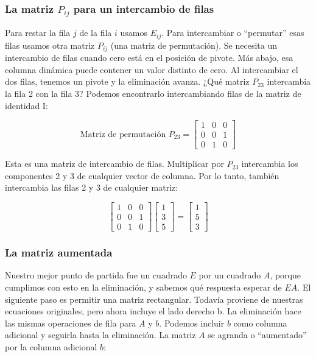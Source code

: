 \subsubsection{La matriz $P_{ij}$ para un intercambio de filas}

Para restar la fila $j$ de la fila $i$ usamos $E_{ij}$. Para intercambiar o ``permutar'' esas filas usamos
otra matriz $P_{ij}$ (una matriz de permutación). Se necesita un intercambio de filas cuando cero está en el
posición de pivote. Más abajo, esa columna dinámica puede contener un valor distinto de cero. Al intercambiar el
dos filas, tenemos un pivote y la eliminación avanza.
¿Qué matriz $P_{23}$ intercambia la fila 2 con la fila 3? Podemos encontrarlo intercambiando filas de
la matriz de identidad I:

\begin{equation}
	\text{Matriz de permutación } P_{23}=\begin{bmatrix}
		1 & 0 & 0 \\ 0& 0& 1 \\ 0 &1 &0
	\end{bmatrix}
\end{equation}

Esta es una matriz de intercambio de filas. Multiplicar por $P_{23}$ intercambia los componentes 2 y 3 de cualquier
vector de columna. Por lo tanto, también intercambia las filas 2 y 3 de cualquier matriz:

\begin{equation*}
	\begin{bmatrix}
		1 & 0 & 0 \\ 0& 0& 1 \\ 0 &1 &0
	\end{bmatrix} \begin{bmatrix}
		1 \\3\\5
	\end{bmatrix}= \begin{bmatrix}
		1 \\5\\3
	\end{bmatrix}
\end{equation*}

\subsubsection{La matriz aumentada}

Nuestro mejor punto de partida fue un cuadrado $E$ por un
cuadrado $A$, porque cumplimos con esto en la eliminación, y sabemos qué respuesta esperar de $EA$.
El siguiente paso es permitir una matriz rectangular. Todavía proviene de nuestras ecuaciones originales,
pero ahora incluye el lado derecho b.
La eliminación hace las mismas operaciones de fila para $A$ y $b$. Podemos incluir
$b$ como columna adicional y seguirla hasta la eliminación. La matriz $A$ se agranda o
``aumentado'' por la columna adicional $b$:


